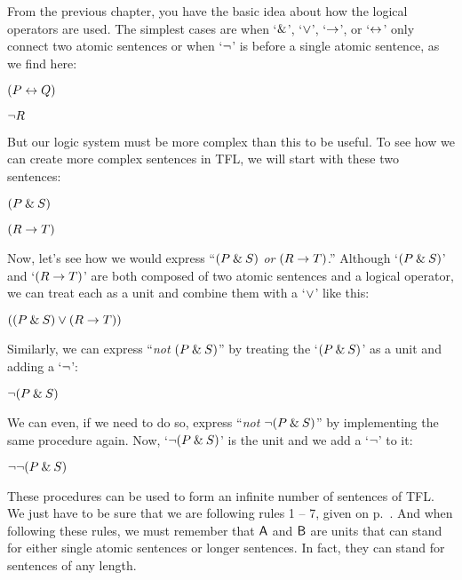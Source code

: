 From the previous chapter, you have the basic idea about how the logical operators are used. The simplest cases are when `$\mathbin{\&}$', `$\vee$', `$\rightarrow$', or `$\leftrightarrow$' only connect two atomic sentences or when `${\neg}$' is before a single atomic sentence, as we find here:  
\begin{earg}
\item[] $(P \leftrightarrow Q)$
\item[] ${\neg} R$
\end{earg}
But our logic system must be more complex than this to be useful. To see how we can create more complex sentences in TFL, we will start with these two sentences:
\begin{earg}
\item[] $(P \mathbin{\&} S)$
\item[] $(R \rightarrow T)$
\end{earg}
Now, let’s see how we would express ``$(P \mathbin{\&} S)$ \textit{or} $(R \rightarrow T)$.'' Although 
`$(P \mathbin{\&} S)$' and
`$(R \rightarrow T)$'
are both composed of two atomic sentences and a logical operator, we can treat each as a unit and combine them with a `$\vee$’ like this:
\begin{earg}
\item[]$((P \mathbin{\&} S) \vee (R \rightarrow T))$
\end{earg}
\noindent Similarly, we can express ``\textit{not} $(P \mathbin{\&} S)$'' by treating the `$(P \mathbin{\&} S)$' as a unit and adding a `${\neg}$’:
\begin{earg}
\item[] ${\neg}(P \mathbin{\&} S)$
\end{earg}
We can even, if we need to do so, express ``\textit{not} ${\neg}(P \mathbin{\&} S)$'' by implementing the same procedure again. Now, `${\neg}(P \mathbin{\&} S)$' is the unit and we add a `${\neg}$’ to it:
\begin{earg}
\item[] ${\neg}{\neg}(P \mathbin{\&} S)$
\end{earg}

These procedures can be used to form an infinite number of sentences of TFL. We just have to be sure that we are following rules 1 -- 7, given on p.~\pageref{TFLsentences}.  And when following these rules, we must remember that $\mathsf{A}$ and $\mathsf{B}$ are units that can stand for either single atomic sentences or longer sentences. In fact, they can stand for sentences of any length.

